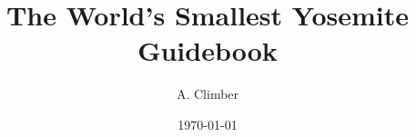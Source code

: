 \title{The World's Smallest Yosemite Guidebook}
\author{A. Climber}
\date{\today}
\def\publisher{Jolly Roger Press}
\def\publisherlogo{jr_press.png}
\def\bookedition{First}
\def\coverimage{}
\def\backcoverimage{}
